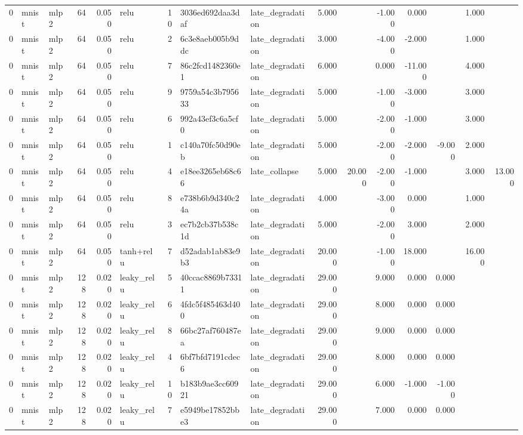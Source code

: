 \begin{table}[htbp]
{\begin{tabular}{@{}rllrrlrllrrrrrrr@{}}
0 & mnist & mlp2 & 64 & 0.050 & relu & 10 & 3036ed692daa3daf & late\_degradation & 5.000 &  & -1.000 & 0.000 &  & 1.000 &  \\
0 & mnist & mlp2 & 64 & 0.050 & relu & 2 & 6c3e8aeb005b9ddc & late\_degradation & 3.000 &  & -4.000 & -2.000 &  & 1.000 &  \\
0 & mnist & mlp2 & 64 & 0.050 & relu & 7 & 86c2fcd1482360e1 & late\_degradation & 6.000 &  & 0.000 & -11.000 &  & 4.000 &  \\
0 & mnist & mlp2 & 64 & 0.050 & relu & 9 & 9759a54c3b795633 & late\_degradation & 5.000 &  & -1.000 & -3.000 &  & 3.000 &  \\
0 & mnist & mlp2 & 64 & 0.050 & relu & 6 & 992a43ef3c6a5cf0 & late\_degradation & 5.000 &  & -2.000 & -1.000 &  & 3.000 &  \\
0 & mnist & mlp2 & 64 & 0.050 & relu & 1 & c140a70fc50d90eb & late\_degradation & 5.000 &  & -2.000 & -2.000 & -9.000 & 2.000 &  \\
0 & mnist & mlp2 & 64 & 0.050 & relu & 4 & e18ee3265eb68c66 & late\_collapse & 5.000 & 20.000 & -2.000 & -1.000 &  & 3.000 & 13.000 \\
0 & mnist & mlp2 & 64 & 0.050 & relu & 8 & e738b6b9d340c24a & late\_degradation & 4.000 &  & -3.000 & 0.000 &  & 1.000 &  \\
0 & mnist & mlp2 & 64 & 0.050 & relu & 3 & ec7b2cb37b538c1d & late\_degradation & 5.000 &  & -2.000 & 3.000 &  & 2.000 &  \\
0 & mnist & mlp2 & 64 & 0.050 & tanh+relu & 7 & d52adab1ab83e9b3 & late\_degradation & 20.000 &  & -1.000 & 18.000 &  & 16.000 &  \\
0 & mnist & mlp2 & 128 & 0.020 & leaky\_relu & 5 & 40ccac8869b73311 & late\_degradation & 29.000 &  & 9.000 & 0.000 & 0.000 &  &  \\
0 & mnist & mlp2 & 128 & 0.020 & leaky\_relu & 6 & 4fdc5f485463d400 & late\_degradation & 29.000 &  & 8.000 & 0.000 & 0.000 &  &  \\
0 & mnist & mlp2 & 128 & 0.020 & leaky\_relu & 8 & 66bc27af760487ea & late\_degradation & 29.000 &  & 9.000 & 0.000 & 0.000 &  &  \\
0 & mnist & mlp2 & 128 & 0.020 & leaky\_relu & 4 & 6bf7bfd7191cdec6 & late\_degradation & 29.000 &  & 8.000 & 0.000 & 0.000 &  &  \\
0 & mnist & mlp2 & 128 & 0.020 & leaky\_relu & 10 & b183b9ae3cc60921 & late\_degradation & 29.000 &  & 6.000 & -1.000 & -1.000 &  &  \\
0 & mnist & mlp2 & 128 & 0.020 & leaky\_relu & 7 & e5949be17852bbe3 & late\_degradation & 29.000 &  & 7.000 & 0.000 & 0.000 &  &  \\

\end{tabular}}
\end{table}
